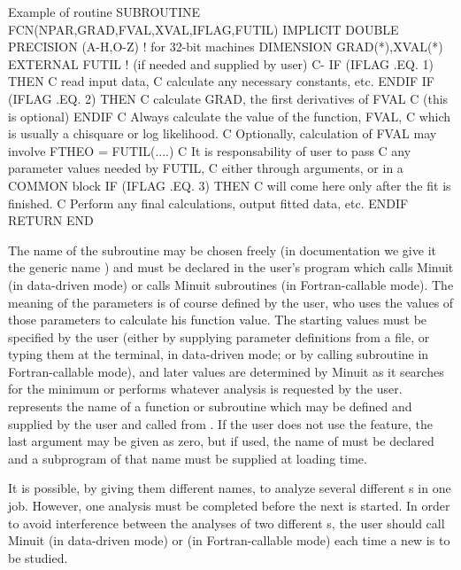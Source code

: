 \begin{XMPt}{Example of  routine}
        SUBROUTINE FCN(NPAR,GRAD,FVAL,XVAL,IFLAG,FUTIL)
        IMPLICIT DOUBLE PRECISION (A-H,O-Z)  !  for 32-bit machines
        DIMENSION GRAD(*),XVAL(*)
        EXTERNAL FUTIL   !    (if needed and supplied by user)
C-
        IF (IFLAG .EQ. 1)  THEN
C           read input data,
C           calculate any necessary constants, etc.
        ENDIF
        IF (IFLAG .EQ. 2)  THEN
C           calculate GRAD, the first derivatives of FVAL
C           (this is optional)
        ENDIF
C             Always calculate the value of the function, FVAL,
C             which is usually a chisquare or log likelihood.
C                  Optionally, calculation of FVAL may involve
        FTHEO = FUTIL(....)
C                  It is responsability of user to pass
C                  any parameter values needed by FUTIL,
C                  either through arguments, or in a COMMON block
         IF (IFLAG .EQ. 3)  THEN
C            will come here only after the fit is finished.
C            Perform any final calculations, output fitted data, etc.
        ENDIF
        RETURN
        END
\end{XMPt}

The name of the subroutine may be chosen freely (in documentation we
give it the generic name ) and must be declared  in the
user's program which calls Minuit (in data-driven mode) or calls
Minuit subroutines (in Fortran-callable mode).
The meaning of the parameters  is of course defined by
the user, who uses the values of those parameters to calculate his
function value.
The starting values must be specified by the user
(either by supplying parameter
definitions from a file, or typing them at the terminal,
in data-driven mode; or
by calling subroutine  in Fortran-callable mode),
and later values are determined by Minuit as it searches for the
minimum or performs whatever analysis is requested by the user.
 represents the name of a function or subroutine which may
be defined and supplied by the user and called from .
If the user does not use the  feature, the last argument
may be given as zero, but if used, the name of  must
be declared  and a subprogram of that name must be
supplied at loading time.
 
It is possible, by giving them different names, to analyze several
different s in one job.
However, one analysis must be completed before the next is started.
In order to avoid interference between the analyses of two different
s, the user should call Minuit (in data-driven mode) or 
(in Fortran-callable mode) each time a new  is to be studied.


